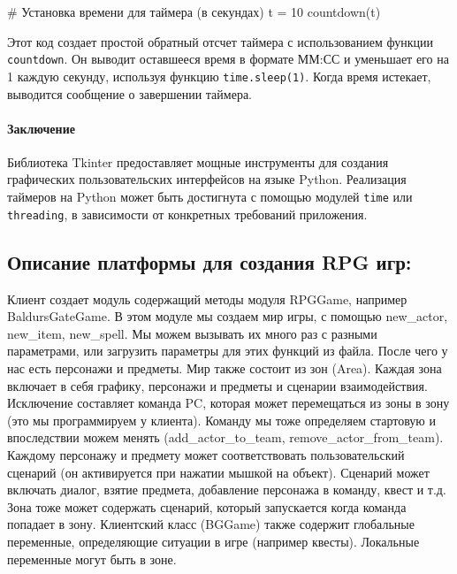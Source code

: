 	\# Установка времени для таймера (в секундах)
	t = 10
	countdown(t)
	
Этот код создает простой обратный отсчет таймера с использованием функции \texttt{countdown}. Он выводит оставшееся время в формате ММ:СС и уменьшает его на 1 каждую секунду, используя функцию \texttt{time.sleep(1)}. Когда время истекает, выводится сообщение о завершении таймера.
	
\paragraph{Заключение}
Библиотека Tkinter предоставляет мощные инструменты для создания графических пользовательских интерфейсов на языке Python. Реализация таймеров на Python может быть достигнута с помощью модулей \texttt{time} или \texttt{threading}, в зависимости от конкретных требований приложения.

\subsection{Описание платформы для создания RPG игр:}
Клиент создает модуль содержащий методы модуля RPGGame, например BaldursGateGame. В этом модуле мы создаем мир игры, с помощью new\_actor, new\_item, new\_spell. Мы можем вызывать их много раз с разными параметрами, или загрузить параметры для этих функций из файла. После чего у нас есть персонажи и предметы. Мир также состоит из зон (Area). Каждая зона включает в себя графику, персонажи и предметы и сценарии взаимодействия. Исключение составляет команда PC, которая может перемещаться из зоны в зону (это мы программируем у клиента). Команду мы тоже определяем стартовую и впоследствии можем менять (add\_actor\_to\_team, remove\_actor\_from\_team). Каждому персонажу и предмету может соответствовать пользовательский сценарий (он активируется при нажатии мышкой на объект). Сценарий может включать диалог, взятие предмета, добавление персонажа в команду, квест и т.д.
Зона тоже может содержать сценарий, который запускается когда команда попадает в зону.
Клиентский класс (BGGame) также содержит глобальные переменные, определяющие ситуации в игре (например квесты). Локальные переменные могут быть в зоне.

